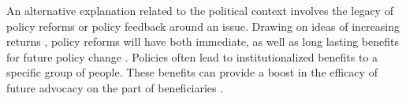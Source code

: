 An alternative explanation related to the political context involves the legacy of policy reforms or policy feedback around an issue. Drawing on ideas of increasing returns \citep{pierson_1996,pierson_2000}, policy reforms will have both immediate, as well as long lasting benefits for future policy change \citep{amenta_et_al_2012}. Policies often lead to institutionalized benefits to a specific group of people. These benefits can provide a boost in the efficacy of future advocacy on the part of beneficiaries \citep{amenta_and_caren_2004}. 









